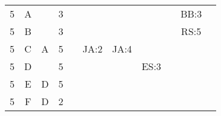 \documentclass[12pt]{article}
\begin{document}
\begin{table}[H]
\begin{tabular}{@{}c|c|c|c|ccccccc@{}}
5     & A    &            & 3                                                      &                                                 &                                                 &                                                  &                                                  &                                                  & BB:3                                             &                                                  \\
5     & B    &            & 3                                                      &                                                 &                                                 &                                                  &                                                  &                                                  & RS:5                                             &                                                  \\
5     & C    & A          & 5                                                      &                                                 & JA:2                                            & JA:4                                             &                                                  &                                                  &                                                  &                                                  \\
5     & D    &            & 5                                                      &                                                 &                                                 &                                                  & ES:3                                             &                                                  &                                                  &                                                  \\ 
5     & E    & D          & 5                                                      &                                                 &                                                 &                                                  &                                                  &                                                  &                                                  &                                                  \\ 
5     & F    & D          & 2                                                      &                                                 &                                                 &                                                  &                                                  &                                                  &                                                  &                                                  \\ 

\end{tabular}
\end{table}
\end{document}
